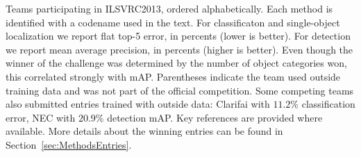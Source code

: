 \begin{table}
\caption{Teams participating in ILSVRC2013, ordered alphabetically. Each method is identified with a codename used in the text. 
For classificaton and single-object localization we report flat top-5 error, in percents (lower is better).  For detection we report mean average precision, in percents (higher is better). Even though the winner of the challenge was determined by the number of object categories won, this correlated strongly with mAP. Parentheses indicate the team used outside training data and was not part of the official competition. Some competing
teams also submitted entries trained with outside data: Clarifai with $11.2\%$ classification error, NEC with $20.9\%$ detection mAP. Key references are provided where available. More details about the winning entries can be found in Section~\ref{sec:MethodsEntries}. }
\label{table:sub13}
\end{table}